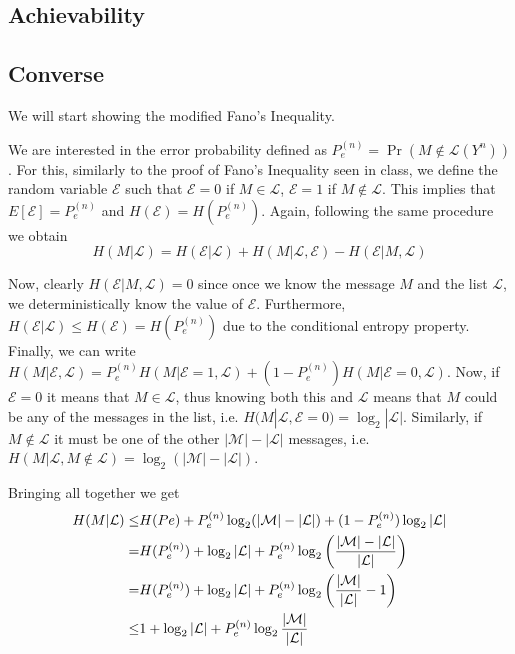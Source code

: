 
\subsection{Achievability}


\subsection{Converse}
We will start showing the modified Fano's Inequality.

We are interested in the error probability defined as $P_e^{(n)} = \Pr(M \notin \mathcal{L}(Y^n))$. For this, similarly to the proof of Fano's Inequality seen in class, we define the random variable $\mathcal{E}$ such that $\mathcal{E}=0$ if $M \in \mathcal{L}$, $\mathcal{E}=1$ if $M \notin \mathcal{L}$. This implies that $E[\mathcal{E}] = P_e^{(n)}$ and $H(\mathcal{E}) = H(P_e^{(n)})$. Again, following the same procedure we obtain
%
\begin{equation}
H(M|\mathcal{L}) = H(\mathcal{E}|\mathcal{L})
+H(M|\mathcal{L},\mathcal{E})
-H(\mathcal{E}|M,\mathcal{L})
\end{equation}

Now, clearly $H(\mathcal{E}|M,\mathcal{L})=0$ since once we know the message $M$ and the list $\mathcal{L}$, we deterministically know the value of $\mathcal{E}$. Furthermore, $H(\mathcal{E}|\mathcal{L}) \leq H(\mathcal{E}) = H(P_e^{(n)})$ due to the conditional entropy property. Finally, we can write $H(M|\mathcal{E},\mathcal{L}) = P_e^{(n)} H(M|\mathcal{E}=1,\mathcal{L}) + (1-P_e^{(n)})H(M|\mathcal{E}=0,\mathcal{L})$. Now, if $\mathcal{E}=0$ it means that $M \in \mathcal{L}$, thus knowing both this and $\mathcal{L}$ means that $M$ could be any of the messages in the list, i.e. $H(M|\mathcal{L},\mathcal{E}=0) = \log_2|\mathcal{L}|$. Similarly, if $M \notin \mathcal{L}$ it must be one of the other $|\mathcal{M}|-|\mathcal{L}|$ messages, i.e. $H(M|\mathcal{L},M\notin \mathcal{L})=\log_2(|\mathcal{M}|-|\mathcal{L}|)$.

Bringing all together we get
%
\begin{align}
\begin{split}
H(M|\mathcal{L}) \leq & H(Pe) + P_e^{(n)}\log_2(|\mathcal{M}|-|\mathcal{L}|) + (1-P_e^{(n)})\log_2|\mathcal{L}|\\
=& H(P_e^{(n)}) + \log_2|\mathcal{L}| + P_e^{(n)}\log_2\qty(\frac{|\mathcal{M}|-|\mathcal{L}|}{|\mathcal{L}|})\\
=& H(P_e^{(n)}) + \log_2|\mathcal{L}| + P_e^{(n)}\log_2\qty(\frac{|\mathcal{M}|}{|\mathcal{L}|} - 1)\\
\leq& 1 + \log_2|\mathcal{L}| + P_e^{(n)}\log_2\frac{|\mathcal{M}|}{|\mathcal{L}|}
\end{split}
\end{align}

